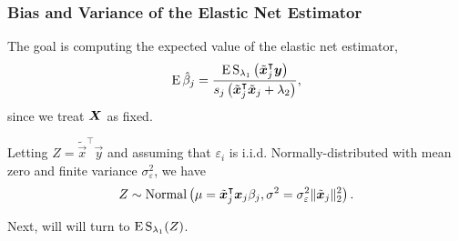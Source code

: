 \documentclass[aspectratio=1610,onlytextwidth]{beamer}
\begin{document}
\begin{frame}[c]
  \frametitle{Bias and Variance of the Elastic Net Estimator}

  The goal is computing the expected value of the elastic net estimator,
  \[
    \operatorname{E} \hat\beta_j = \frac{\operatorname{E} \operatorname{S}_{\lambda_1}\left(\tilde{\boldsymbol{x}}_j^\intercal \boldsymbol{y}\right)}{s_j\left(\tilde{\boldsymbol{x}}_j^\intercal \tilde{\boldsymbol{x}}_j + \lambda_2\right)},
  \]
  since we treat \(\boldsymbol{X}\) as fixed.

  \bigskip\pause

  Letting \(Z = \tilde{\vec{x}}^\intercal \vec{y}\) and assuming that \(\varepsilon_i\) is
  i.i.d. Normally-distributed with mean zero and finite variance \(\sigma_\varepsilon^2\), we
  have
  \[
    Z \sim \operatorname{Normal}\left(\mu = \tilde{\boldsymbol{x}}_j^\intercal\boldsymbol{x}_j \beta_j, \sigma^2 =  \sigma_\varepsilon^2 \lVert \tilde{\boldsymbol{x}}_j\rVert_2^2 \right).
  \]


  \bigskip

  Next, will will turn to \(\operatorname{E} \operatorname{S}_{\lambda_1}(Z)\).
\end{frame}
\end{document}
